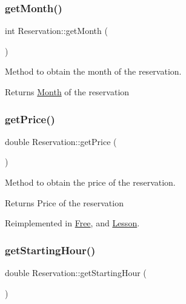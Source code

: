 \subsubsection{\texorpdfstring{get\+Month()}{getMonth()}}
{\footnotesize\ttfamily int Reservation\+::get\+Month (\begin{DoxyParamCaption}{ }\end{DoxyParamCaption})}



Method to obtain the month of the reservation. 

\begin{DoxyReturn}{Returns}
\mbox{\hyperlink{class_month}{Month}} of the reservation 
\end{DoxyReturn}
\mbox{\label{class_reservation_a62cdb2f1a24e2fce92fb9f024ae9f494}} 
\subsubsection{\texorpdfstring{get\+Price()}{getPrice()}}
{\footnotesize\ttfamily double Reservation\+::get\+Price (\begin{DoxyParamCaption}{ }\end{DoxyParamCaption})\hspace{0.3cm}{\ttfamily [virtual]}}



Method to obtain the price of the reservation. 

\begin{DoxyReturn}{Returns}
Price of the reservation 
\end{DoxyReturn}


Reimplemented in \mbox{\hyperlink{class_free_a229f009a7535eeba0a6ff4495de8c6bf}{Free}}, and \mbox{\hyperlink{class_lesson_ad7a2f708f870040627a442cdf000683f}{Lesson}}.

\mbox{\label{class_reservation_a28da7b16dadfeb33bf5351cabc8dbb0b}} 
\subsubsection{\texorpdfstring{get\+Starting\+Hour()}{getStartingHour()}}
{\footnotesize\ttfamily double Reservation\+::get\+Starting\+Hour (\begin{DoxyParamCaption}{ }\end{DoxyParamCaption})}



